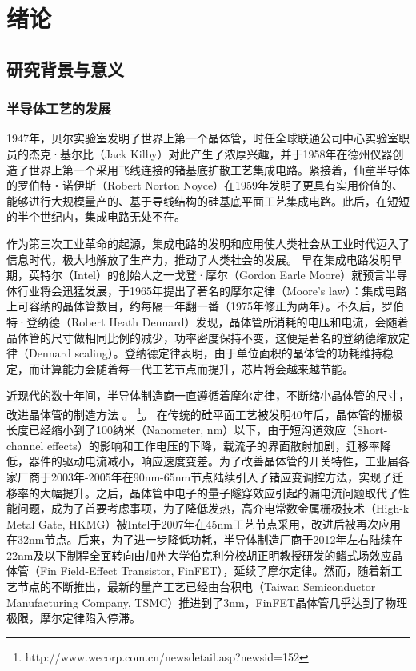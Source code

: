 \chapter{绪论}

\section{研究背景与意义}

\subsection{半导体工艺的发展}

1947年，贝尔实验室发明了世界上第一个晶体管，时任全球联通公司中心实验室职员的杰克·基尔比（Jack Kilby）对此产生了浓厚兴趣，并于1958年在德州仪器创造了世界上第一个采用飞线连接的锗基底扩散工艺集成电路。紧接着，仙童半导体的罗伯特・诺伊斯（Robert Norton Noyce）在1959年发明了更具有实用价值的、能够进行大规模量产的、基于导线结构的硅基底平面工艺集成电路。此后，在短短的半个世纪内，集成电路无处不在。

作为第三次工业革命的起源，集成电路的发明和应用使人类社会从工业时代迈入了信息时代，极大地解放了生产力，推动了人类社会的发展。
早在集成电路发明早期，英特尔（Intel）的创始人之一戈登·摩尔（Gordon Earle Moore）就预言半导体行业将会迅猛发展，于1965年提出了著名的摩尔定律（Moore's law）\cite{moore_law_0}：集成电路上可容纳的晶体管数目，约每隔一年翻一番（1975年修正为两年\cite{moore_law_1}）。不久后，罗伯特·登纳德（Robert Heath Dennard）发现，晶体管所消耗的电压和电流，会随着晶体管的尺寸做相同比例的减少，功率密度保持不变，这便是著名的登纳德缩放定律（Dennard scaling）\cite{dennard_scaling}。登纳德定律表明，由于单位面积的晶体管的功耗维持稳定，而计算能力会随着每一代工艺节点而提升，芯片将会越来越节能。

近现代的数十年间，半导体制造商一直遵循着摩尔定律，不断缩小晶体管的尺寸，改进晶体管的制造方法
\ifdefined\Blind
。
\else
\footnote{http://www.wecorp.com.cn/newsdetail.asp?newsid=152}。
\fi
在传统的硅平面工艺被发明40年后，晶体管的栅极长度已经缩小到了100纳米（Nanometer, nm）以下\cite{90nm_uniaxial_strained}，由于短沟道效应（Short-channel effects）的影响\cite{short-channel_effect}和工作电压的下降，载流子的界面散射加剧，迁移率降低，器件的驱动电流减小，响应速度变差。为了改善晶体管的开关特性，工业届各家厂商于2003年-2005年在90nm-65nm节点陆续引入了锗应变调控方法\cite{90nm_ge_strained,65nm_strained}，实现了迁移率的大幅提升。之后，晶体管中电子的量子隧穿效应引起的漏电流问题取代了性能问题，成为了首要考虑事项，为了降低发热，高介电常数金属栅极技术（High-k Metal Gate, HKMG）被Intel于2007年在45nm工艺节点采用\cite{45nm_hkmg}，改进后被再次应用在32nm节点\cite{32nm_hkmg_2nd}。后来，为了进一步降低功耗，半导体制造厂商于2012年左右陆续在22nm及以下制程全面转向由加州大学伯克利分校胡正明教授研发的鳍式场效应晶体管（Fin Field-Effect Transistor, FinFET）\cite{FinFET}，延续了摩尔定律。然而，随着新工艺节点的不断推出，最新的量产工艺已经由台积电（Taiwan Semiconductor Manufacturing Company, TSMC）推进到了3nm，FinFET晶体管几乎达到了物理极限，摩尔定律陷入停滞。

